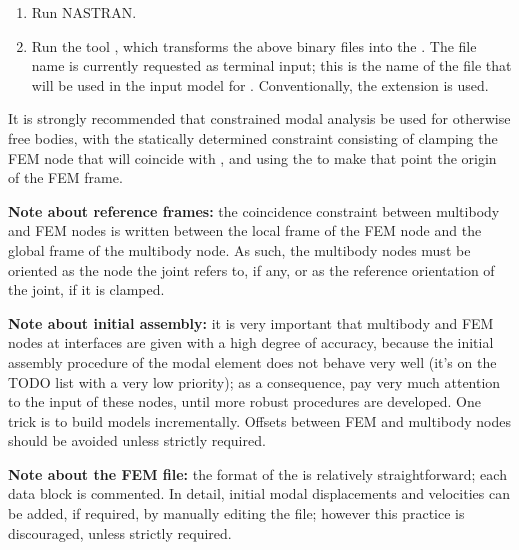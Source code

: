 \begin{enumerate}
\item Run NASTRAN.


\item Run the tool , which transforms the above binary files
into the .
The file name is currently requested as terminal input; this is the name 
of the file that will be used in the input model for .
Conventionally, the  extension is used.

\end{enumerate} %

\noindent
It is strongly recommended that constrained modal analysis
be used for otherwise free bodies, with the statically 
determined constraint consisting of clamping the FEM node 
that will coincide with , and using
the  to make that point the origin of the FEM frame.

\noindent
\textbf{Note about reference frames:} the coincidence constraint between 
multibody and FEM nodes is written between the local frame 
of the FEM node and the global frame of the multibody node.
As such, the multibody nodes must be oriented as the 
node the  joint refers to, if any, or as the reference
orientation of the  joint, if it is clamped.

\noindent
\textbf{Note about initial assembly:} it is very important that multibody 
and FEM nodes at interfaces are given with a high degree of accuracy,
because the initial assembly procedure of the modal element
does not behave very well (it's on the TODO list with a very low
priority); as a consequence, pay very much attention to the input
of these nodes, until more robust procedures are developed.
One trick is to build models incrementally.
Offsets between FEM and multibody nodes should be avoided
unless strictly required.

\noindent
\textbf{Note about the FEM file:}
the format of the  is relatively straightforward;
each data block is commented.
In detail, initial modal displacements and velocities can be added,
if required, by manually editing the file; however this practice
is discouraged, unless strictly required.

